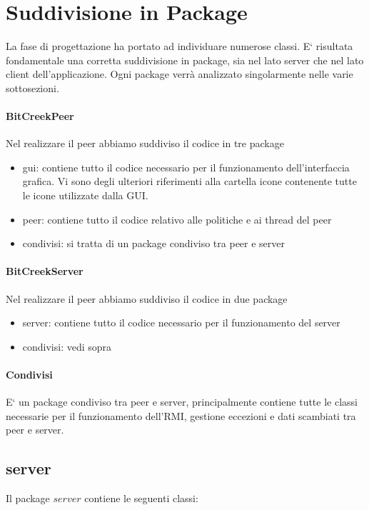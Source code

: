 \section{Suddivisione in Package}

La fase di progettazione ha portato ad individuare numerose classi. E` risultata fondamentale una corretta suddivisione in package, sia nel lato server che nel lato client dell'applicazione. Ogni package verr\`a analizzato singolarmente nelle varie sottosezioni.

\paragraph{BitCreekPeer}
Nel realizzare il peer abbiamo suddiviso il codice in tre package
\begin{itemize}
\item gui: contiene tutto il codice necessario per il funzionamento dell'interfaccia grafica. Vi sono degli ulteriori riferimenti alla cartella icone contenente tutte le icone utilizzate dalla GUI.
\item peer: contiene tutto il codice relativo alle politiche e ai thread del peer
\item condivisi: si tratta di un package condiviso tra peer e server
\end{itemize}
\paragraph{BitCreekServer}
Nel realizzare il peer abbiamo suddiviso il codice in due package
\begin{itemize}
\item server: contiene tutto il codice necessario per il funzionamento del server
\item condivisi: vedi sopra
\end{itemize}
\paragraph{Condivisi}
E` un package condiviso tra peer e server, principalmente contiene tutte le classi necessarie per il funzionamento dell'RMI, gestione eccezioni e dati scambiati tra peer e server.

\subsection{server}

Il package $server$ contiene le seguenti classi:


